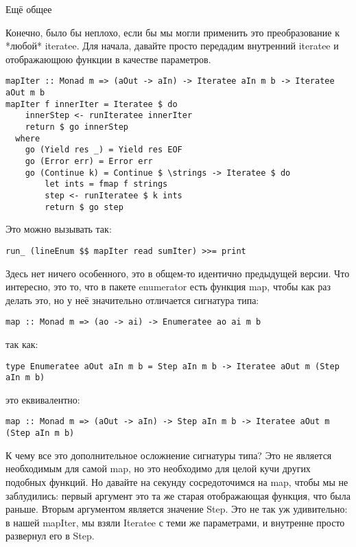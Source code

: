 Ещё общее

Конечно, было бы неплохо, если бы мы могли применить это преобразование к *любой* iteratee. Для начала, давайте просто передадим внутренний iteratee и отображающюю функции в качестве параметров.

\begin{lstlisting}
mapIter :: Monad m => (aOut -> aIn) -> Iteratee aIn m b -> Iteratee aOut m b
mapIter f innerIter = Iteratee $ do
    innerStep <- runIteratee innerIter
    return $ go innerStep
  where
    go (Yield res _) = Yield res EOF
    go (Error err) = Error err
    go (Continue k) = Continue $ \strings -> Iteratee $ do
        let ints = fmap f strings
        step <- runIteratee $ k ints
        return $ go step
\end{lstlisting}

Это можно вызывать так:

\begin{lstlisting}
run_ (lineEnum $$ mapIter read sumIter) >>= print
\end{lstlisting}

Здесь нет ничего особенного, это в общем-то идентично предыдущей версии. Что интересно, это то, что в пакете enumerator есть  функция map, чтобы как раз делать это, но у неё значительно отличается сигнатура типа:

\begin{lstlisting}
map :: Monad m => (ao -> ai) -> Enumeratee ao ai m b
\end{lstlisting}

так как:

\begin{lstlisting}
type Enumeratee aOut aIn m b = Step aIn m b -> Iteratee aOut m (Step aIn m b)
\end{lstlisting}

это еквивалентно:

\begin{lstlisting}
map :: Monad m => (aOut -> aIn) -> Step aIn m b -> Iteratee aOut m (Step aIn m b)
\end{lstlisting}

К чему все это дополнительное осложнение сигнатуры типа? Это не является необходимым для самой map, но это необходимо для целой кучи других подобных функций. Но давайте на секунду сосредоточимся на map, чтобы мы не заблудились: первый аргумент это та же старая отображающая функция, что была раньше. Вторым аргументом является значение Step. Это не так уж удивительно: в нашей mapIter, мы взяли Iteratee с теми же параметрами, и внутренне просто развернул его в Step.


